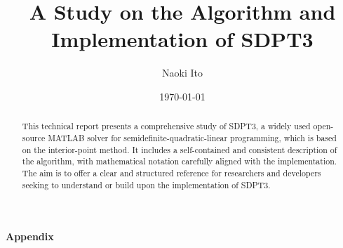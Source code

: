 \documentclass{scrartcl}
\title{A Study on the Algorithm and Implementation of SDPT3}
\author{
    Naoki Ito
}
\date{\today}
\begin{document}
\maketitle
\begin{abstract}
This technical report presents a comprehensive study of SDPT3, a widely used open-source MATLAB solver for semidefinite-quadratic-linear programming, which is based on the interior-point method.
It includes a self-contained and consistent description of the algorithm, with mathematical notation carefully aligned with the implementation.
The aim is to offer a clear and structured reference for researchers and developers seeking to understand or build upon the implementation of SDPT3.
\end{abstract}

\tableofcontents









\clearpage
{}
{}
\begin{center}
{\Large\bfseries\textsf{Appendix}}
\end{center}
\vspace{2em}

\appendix




\end{document}
